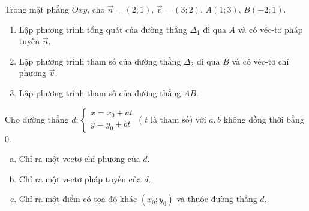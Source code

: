 

\begin{bt}%
	Trong mặt phẳng $Oxy$, cho $\overrightarrow{n}=(2;1)$, $\overrightarrow{v}=(3;2)$, $A(1;3)$, $B(-2;1)$.
	\begin{enumerate}
		\item Lập phương trình tổng quát của đường thẳng $\Delta_1$ đi qua $A$ và có véc-tơ pháp tuyến $\overrightarrow{n}$.
		\item Lập phương trình tham số của đường thẳng $\Delta_2$ đi qua $B$ và có véc-tơ chỉ phương $\overrightarrow{v}$.
		\item Lập phương trình tham số của đường thẳng $AB$.
	\end{enumerate}
\end{bt}

\begin{bt}%
	Cho đường thẳng $d:\left\{\begin{array}{l}x=x_{0}+a t \\ y=y_{0}+b t\end{array}\right.$ ( $t$ là tham số) với $a, b$ không đồng thời bằng $0$.
	\begin{enumerate}[a)]
	\item Chỉ ra một vectơ chỉ phương của $d$.
	\item Chỉ ra một vectơ pháp tuyến của $d$.
	\item Chỉ ra một điểm có tọa độ khác $\left(x_{0} ; y_{0}\right)$ và thuộc đường thẳng $d$.
	\end{enumerate}
\end{bt}

